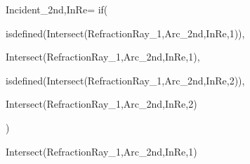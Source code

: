 Incident_{2nd,InRe}=
  if(
    

    isdefined(Intersect(RefractionRay_{1},Arc_{2nd,InRe},1)),

    Intersect(RefractionRay_{1},Arc_{2nd,InRe},1),

    isdefined(Intersect(RefractionRay_{1},Arc_{2nd,InRe},2)),

    Intersect(RefractionRay_{1},Arc_{2nd,InRe},2)

  )

    Intersect(RefractionRay_{1},Arc_{2nd,InRe},1)